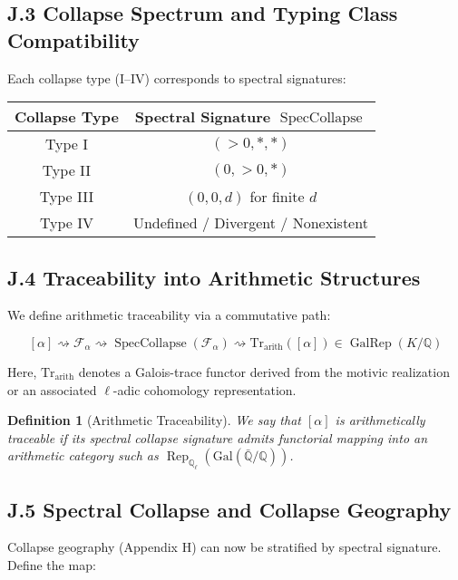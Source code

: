 \documentclass[11pt]{article}
\newtheorem{definition}[theorem]{Definition}
\begin{document}
\subsection*{J.3 Collapse Spectrum and Typing Class Compatibility}

Each collapse type (I–IV) corresponds to spectral signatures:

\begin{center}
\begin{tabular}{|c|c|}
\hline
\textbf{Collapse Type} & \textbf{Spectral Signature} $\operatorname{SpecCollapse}$ \\
\hline
Type I & $(>0, *, *)$ \\
Type II & $(0, >0, *)$ \\
Type III & $(0, 0, d)$ for finite $d$ \\
Type IV & Undefined / Divergent / Nonexistent \\
\hline
\end{tabular}
\end{center}

\subsection*{J.4 Traceability into Arithmetic Structures}

We define arithmetic traceability via a commutative path:

\[
[\alpha] \rightsquigarrow \mathcal{F}_\alpha \rightsquigarrow \operatorname{SpecCollapse}(\mathcal{F}_\alpha) \rightsquigarrow \mathrm{Tr}_\mathrm{arith}([\alpha]) \in \operatorname{GalRep}(K/\mathbb{Q})
\]

Here, $\mathrm{Tr}_\mathrm{arith}$ denotes a Galois-trace functor derived from the motivic realization or an associated $\ell$-adic cohomology representation.

\begin{definition}[Arithmetic Traceability]
We say that $[\alpha]$ is \emph{arithmetically traceable} if its spectral collapse signature admits functorial mapping into an arithmetic category such as $\operatorname{Rep}_{\mathbb{Q}_\ell}(\mathrm{Gal}(\bar{\mathbb{Q}}/\mathbb{Q}))$.
\end{definition}

\subsection*{J.5 Spectral Collapse and Collapse Geography}

Collapse geography (Appendix H) can now be stratified by spectral signature. Define the map:
\end{document}
